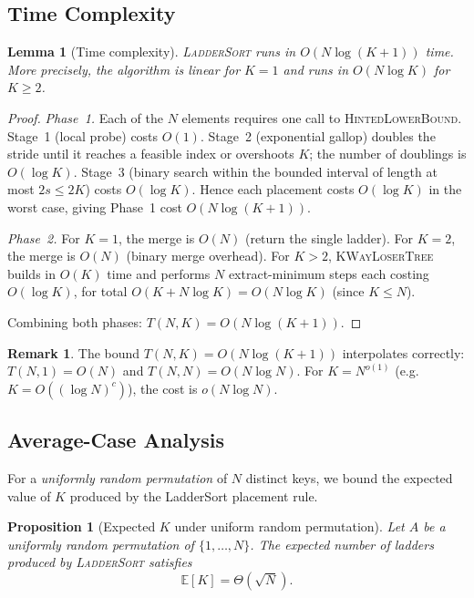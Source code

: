 \documentclass[12pt,a4paper]{article}
\theoremstyle{plain}
\newtheorem{lemma}[theorem]{Lemma}
\newtheorem{proposition}[theorem]{Proposition}
\theoremstyle{definition}
\newtheorem{remark}[theorem]{Remark}
\begin{document}
\subsection{Time Complexity}
\label{sec:timecomplexity}

\begin{lemma}[Time complexity]
\label{lem:complexity}
\textsc{LadderSort} runs in $O(N\log(K+1))$ time. More precisely, the algorithm is linear for $K=1$ and runs in $O(N\log K)$ for $K \ge 2$.
\end{lemma}

\begin{proof}
\emph{Phase~1.}  Each of the $N$ elements requires one call to
\textsc{HintedLowerBound}.  Stage~1 (local probe) costs $O(1)$.
Stage~2 (exponential gallop) doubles the stride until it reaches a
feasible index or overshoots $K$; the number of doublings is
$O(\log K)$.  Stage~3 (binary search within the bounded interval of
length at most $2s \le 2K$) costs $O(\log K)$.  Hence each placement
costs $O(\log K)$ in the worst case, giving Phase~1 cost $O(N \log(K+1))$.

\emph{Phase~2.}  For $K = 1$, the merge is $O(N)$ (return the single ladder).
For $K = 2$, the merge is $O(N)$ (binary merge overhead).  For $K > 2$, \textsc{KWayLoserTree} builds in $O(K)$ time
and performs $N$ extract-minimum steps each costing $O(\log K)$, for
total $O(K + N\log K) = O(N\log K)$ (since $K \le N$).

Combining both phases: $T(N, K) = O(N\log(K+1))$.
\end{proof}

\begin{remark}
The bound $T(N,K)=O(N\log(K+1))$ interpolates correctly: $T(N,1)=O(N)$ and $T(N,N)=O(N\log N)$.  For $K = N^{o(1)}$ (e.g.\ $K = O((\log N)^c)$),
the cost is $o(N \log N)$.
\end{remark}


\subsection{Average-Case Analysis}
\label{sec:avgcase}

For a \emph{uniformly random permutation} of $N$ distinct keys, we bound the
expected value of $K$ produced by the LadderSort placement rule.

\begin{proposition}[Expected $K$ under uniform random permutation]
\label{prop:avgcase}
Let $A$ be a uniformly random permutation of $\{1, \dots, N\}$.  The
expected number of ladders produced by \textsc{LadderSort} satisfies
\[
  \mathbb{E}[K] = \Theta(\sqrt{N}).
\]
\end{proposition}
\end{document}
